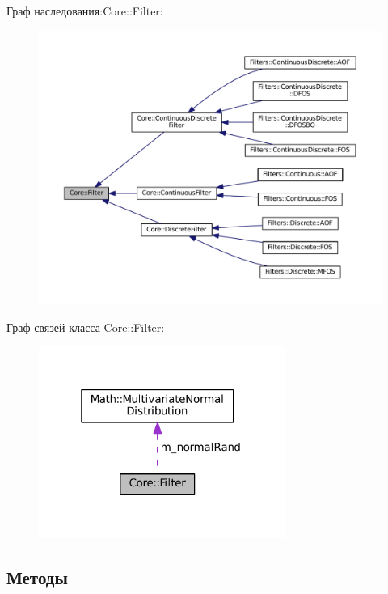 Граф наследования\+:Core\+:\+:Filter\+:
\nopagebreak
\begin{figure}[H]
\begin{center}
\leavevmode
\includegraphics[width=350pt]{class_core_1_1_filter__inherit__graph}
\end{center}
\end{figure}


Граф связей класса Core\+:\+:Filter\+:
\nopagebreak
\begin{figure}[H]
\begin{center}
\leavevmode
\includegraphics[width=229pt]{class_core_1_1_filter__coll__graph}
\end{center}
\end{figure}


\subsection{Методы}
\hypertarget{class_core_1_1_filter_ad5070e695763edc66d211651b98c09f1}{}\label{class_core_1_1_filter_ad5070e695763edc66d211651b98c09f1} 
